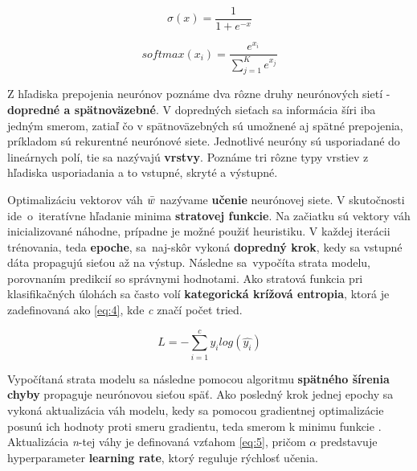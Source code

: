 \vspace{5pt}
\noindent
\begin{minipage}[t]{.45\textwidth}
    \begin{equation} 
        \label{eq:2}
        \sigma(x) = \frac{1}{1 + e^{-x}}
    \end{equation}
\end{minipage}
\hfill
\begin{minipage}[t]{.45\textwidth}
    \begin{equation} 
        \label{eq:3}
        softmax(x_i) = \frac{e^{x_i}}{\sum_{j=1}^{K} e^{x_j}}
    \end{equation}
\end{minipage}
\vspace{5pt}

Z hľadiska prepojenia neurónov poznáme dva rôzne druhy neurónových sietí - \textbf{dopredné a spätnoväzebné}. V dopredných sieťach sa informácia šíri iba jedným smerom, zatiaľ čo v spätnoväzebných sú umožnené aj spätné prepojenia, príkladom sú rekurentné neurónové siete.
Jednotlivé neuróny sú usporiadané do lineárnych polí, tie sa nazývajú \textbf{vrstvy}. Poznáme tri rôzne typy vrstiev z hľadiska usporiadania a to vstupné, skryté a výstupné. 

Optimalizáciu vektorov váh \textit{\( \Bar{w} \)} nazývame \textbf{učenie} neurónovej siete. V skutočnosti ide~o~iteratívne hľadanie minima \textbf{stratovej funkcie}. Na začiatku sú vektory váh inicializované náhodne, prípadne je možné použiť heuristiku. V každej iterácii trénovania, teda \textbf{epoche}, sa~naj-skôr vykoná \textbf{dopredný krok}, kedy sa vstupné dáta propagujú sieťou až na výstup. Následne sa~vypočíta strata modelu, porovnaním predikcií so správnymi hodnotami. Ako stratová funkcia pri klasifikačných úlohách sa často volí \textbf{kategorická krížová entropia}, ktorá je zadefinovaná ako \ref{eq:4}, kde \textit{c} značí počet tried.

\begin{equation} 
    \label{eq:4}
    L = -\sum_{i=1}^{c} y_i log(\hat{y_i})
\end{equation}

Vypočítaná strata modelu sa následne pomocou algoritmu \textbf{spätného šírenia chyby} propaguje neurónovou sieťou späť. Ako posledný krok jednej epochy sa vykoná aktualizácia váh modelu, kedy sa pomocou gradientnej optimalizácie posunú ich hodnoty proti smeru gradientu, teda smerom k minimu funkcie \cite{Zou2008}\cite{yegnanarayana2009artificial}\cite{mehrotra1997elements}. Aktualizácia \textit{n}-tej váhy je definovaná vzťahom \ref{eq:5}, pričom \textit{\( \alpha \)} predstavuje hyperparameter \textbf{learning rate}, ktorý reguluje rýchlosť učenia.

